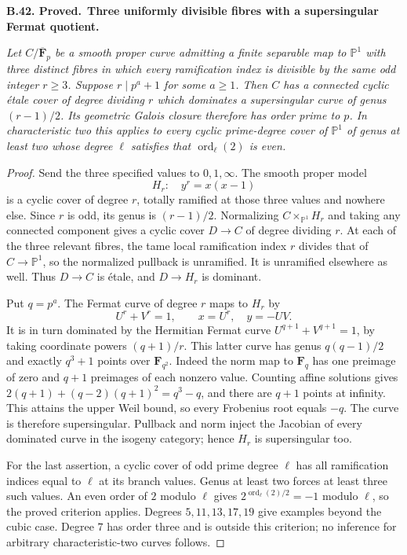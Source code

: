 \documentclass[11pt,a4paper]{article}
\newcommand{\F}{\mathbf F}
\newenvironment{claim}[3]{\par\medskip\noindent\hypertarget{#1}{\textbf{#1. #2.}}\ \textbf{#3.}\par\nopagebreak\smallskip\begingroup\itshape}{\endgroup\par\smallskip}
\begin{document}
\begin{claim}{B.42}{Proved}{Three uniformly divisible fibres with a supersingular Fermat quotient}
Let $C/\overline{\F}_p$ be a smooth proper curve admitting
a finite separable map to $\mathbb P^1$ with three
distinct fibres in which every ramification index is
divisible by the same odd integer $r\ge3$.
Suppose $r\mid p^a+1$ for some $a\ge1$.
Then $C$ has a connected cyclic \'etale cover of degree
dividing $r$ which dominates a supersingular curve of
genus $(r-1)/2$. Its geometric Galois closure therefore
has order prime to $p$.
In characteristic two this applies to every cyclic
prime-degree cover of $\mathbb P^1$ of genus at least
two whose degree $\ell$ satisfies that
$\operatorname{ord}_\ell(2)$ is even.
\end{claim}

\begin{proof}
Send the three specified values to $0,1,\infty$.
The smooth proper model
\[
 H_r:\quad y^r=x(x-1)
\]
is a cyclic cover of degree $r$, totally ramified
at those three values and nowhere else. Since $r$
is odd, its genus is $(r-1)/2$. Normalizing
$C\times_{\mathbb P^1}H_r$ and taking any connected
component gives a cyclic cover $D\to C$ of degree
dividing $r$. At each of the three relevant fibres,
the tame local ramification index $r$ divides that
of $C\to\mathbb P^1$, so the normalized pullback is
unramified. It is unramified elsewhere as well.
Thus $D\to C$ is \'etale, and $D\to H_r$ is dominant.

Put $q=p^a$. The Fermat curve of degree $r$ maps
to $H_r$ by
\[
 U^r+V^r=1,\qquad x=U^r,\quad y=-UV.
\]
It is in turn dominated by the Hermitian Fermat
curve $U^{q+1}+V^{q+1}=1$, by taking coordinate
powers $(q+1)/r$. This latter curve has genus
$q(q-1)/2$ and exactly $q^3+1$ points over
$\F_{q^2}$. Indeed the norm map to $\F_q$ has
one preimage of zero and $q+1$ preimages of each
nonzero value. Counting affine solutions gives
$2(q+1)+(q-2)(q+1)^2=q^3-q$, and there are
$q+1$ points at infinity. This attains the upper
Weil bound, so every Frobenius root equals $-q$.
The curve is therefore supersingular. Pullback
and norm inject the Jacobian of every dominated
curve in the isogeny category; hence $H_r$ is
supersingular too.

For the last assertion, a cyclic cover of odd prime
degree $\ell$ has all ramification indices equal
to $\ell$ at its branch values. Genus at least two
forces at least three such values. An even order
of $2$ modulo $\ell$ gives
$2^{\operatorname{ord}_\ell(2)/2}=-1$ modulo
$\ell$, so the proved criterion applies. Degrees
$5,11,13,17,19$ give examples beyond the cubic
case. Degree $7$ has order three and is outside
this criterion; no inference for arbitrary
characteristic-two curves follows.
\end{proof}
\end{document}
